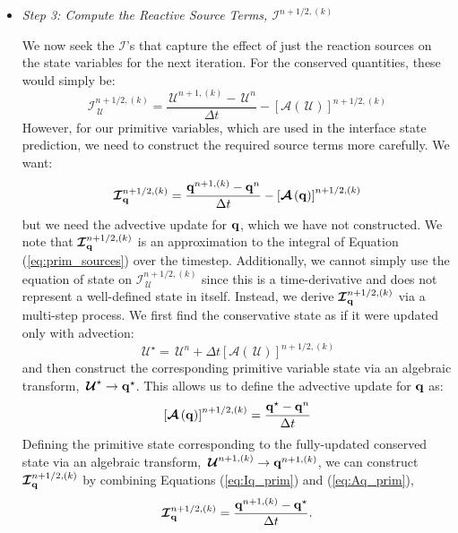 \documentclass[linenumbers,trackchanges]{aastex631}
\newcommand{\Ic}{{\boldsymbol{\mathcal{I}}}}
\newcommand{\Uc}{{\,\bm{\mathcal{U}}}}
\newcommand{\qb}{{\bf q}}
\newcommand{\Adv}[1]{{\left [\boldsymbol{\mathcal{A}} \left(#1\right)\right]}}
\begin{document}
\begin{itemize}
\begin{itemize}
  \item {\em Step 3: Compute the Reactive Source Terms, $\Ic^{n+1/2,(k)}$}

    We now seek the $\Ic$'s that capture the effect of just the
    reaction sources on the state variables for the next iteration.
    For the conserved quantities, these would simply be:
    \begin{equation}
      \Ic^{n+1/2,(k)}_{\Uc} = \frac{\Uc^{n+1,(k)} - \Uc^n}{\Delta t} - \Adv{\Uc}^{n+1/2,(k)}
    \end{equation}
    However, for our primitive variables, which are used in the
    interface state prediction, we need to construct the required source terms more
    carefully.  We want:
    \begin{equation}
      \Ic^{n+1/2,(k)}_{\qb} = \frac{\qb^{n+1,(k)} - \qb^n}{\Delta t} - \Adv{\qb}^{n+1/2,(k)}\label{eq:Iq_prim}
    \end{equation}
    but we need the advective update for $\qb$, which we have not
    constructed.  We note that $\Ic^{n+1/2,(k)}_\qb$ is an approximation to the integral of
    Equation (\ref{eq:prim_sources}) over the timestep.  Additionally, we cannot simply use the equation of
    state on $\Ic^{n+1/2,(k)}_{\Uc}$ since this is a time-derivative and
    does not represent a well-defined state in itself.  Instead, we
    derive $\Ic^{n+1/2,(k)}_{\qb}$ via a multi-step process.  We first find
    the conservative state as if it were updated only with advection:
    \begin{equation}
      \Uc^\star = \Uc^n + \Delta t \Adv{\Uc}^{n+1/2,(k)}
    \end{equation}
    and then construct the corresponding primitive variable state via an algebraic transform,
    $\Uc^\star \rightarrow \qb^\star$.
    This allows us to define the advective update for $\qb$ as:
    \begin{equation}
      \Adv{\qb}^{n+1/2,(k)} = \frac{\qb^\star - \qb^n}{\Delta t}\label{eq:Aq_prim}
    \end{equation}
    Defining the primitive state corresponding to the fully-updated
    conserved state via an algebraic transform, $\Uc^{n+1,(k)}
    \rightarrow \qb^{n+1,(k)}$, we can construct $\Ic^{n+1/2,(k)}_{\qb}$ by
    combining Equations (\ref{eq:Iq_prim}) and (\ref{eq:Aq_prim}),
    \begin{equation}
      \Ic^{n+1/2,(k)}_{\qb} = \frac{\qb^{n+1,(k)} - \qb^\star}{\Delta t}.
    \end{equation}





  \end{itemize}

\end{itemize}
\end{document}
